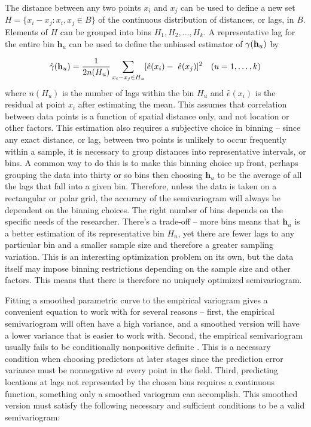 \documentclass[12pt,twoside]{reedthesis}
\begin{document}
The distance between any two points $x_i$ and $x_j$ can be used to define a new set $H = \{ x_i - x_j: x_i, x_j \in B \}$ of the continuous distribution of distances, or lags, in $B$. Elements of $H$ can be grouped into bins $H_1, H_2, \dots, H_k$. A representative lag for the entire bin $\mathbf{h}_u$ can be used to define the unbiased estimator of $\gamma(\bold{h}_u)$ by

\begin{align*} 
   \hat\gamma(\bold{h}_u) = { 1 \over {2n(H_u)}} \sum_{x_i - x_j \in H_u} [ \hat e(x_i) - \
   \hat e(x_j) ] ^2 \quad (u = 1, \dots, k)
\end{align*}
where $n(H_u)$ is the number of lags within the bin $H_u$ and $\hat e(x_i)$ is the residual at point $x_i$ after estimating the mean. This assumes that correlation between data points is a function of spatial distance only, and not location or other factors. This estimation also requires a subjective choice in binning -- since any exact distance, or lag, between two points is unlikely to occur frequently within a sample, it is necessary to group distances into representative intervals, or bins. A common way to do this is to make this binning choice up front, perhaps grouping the data into thirty or so bins then choosing $\mathbf{h}_u$ to be the average of all the lags that fall into a given bin. Therefore, unless the data is taken on a rectangular or polar grid, the accuracy of the semivariogram will always be dependent on the binning choices. The right number of bins depends on the specific needs of the researcher. There's a trade-off -- more bins means that $\mathbf{h}_u$ is a better estimation of its representative bin $H_u$, yet there are fewer lags to any particular bin and a smaller sample size and therefore a greater sampling variation. This is an interesting optimization problem on its own, but the data itself may impose binning restrictions depending on the sample size and other factors. This means that there is therefore no uniquely optimized semivariogram. 

Fitting a smoothed parametric curve to the empirical variogram gives a convenient equation to work with for several reasons -- first, the empirical semivariogram will often have a high variance, and a smoothed version will have a lower variance that is easier to work with. Second, the empirical semivariogram usually fails to be conditionally nonpositive definite \cite{gelfand:2010}. This is a necessary condition when choosing predictors at later stages since the prediction error variance must be nonnegative at every point in the field. Third, predicting locations at lags not represented by the chosen bins requires a continuous function, something only a smoothed variogram can accomplish. This smoothed version must satisfy the following necessary and sufficient conditions to be a valid semivariogram: 
\end{document}
